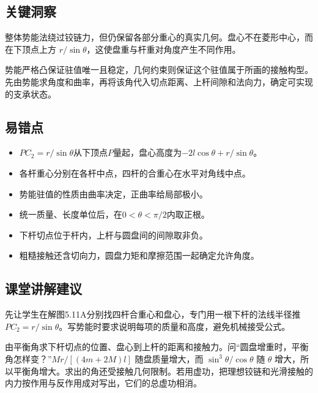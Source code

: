 \documentclass[UTF8,fontset=fandol,a4paper,11pt]{ctexart}
\begin{document}
\subsection*{关键洞察}

整体势能法绕过铰链力，但仍保留各部分重心的真实几何。盘心不在菱形中心，而在下顶点上方 $r/\sin\theta$，这使盘重与杆重对角度产生不同作用。

势能严格凸保证驻值唯一且稳定，几何约束则保证这个驻值属于所画的接触构型。先由势能求角度和曲率，再将该角代入切点距离、上杆间隙和法向力，确定可实现的支承状态。



\subsection*{易错点}

\begin{itemize}
\item $PC_2=r/\sin\theta$从下顶点$P$量起，盘心高度为$-2l\cos\theta+r/\sin\theta$。
\item 各杆重心分别在各杆中点，四杆的合重心在水平对角线中点。
\item 势能驻值的性质由曲率决定，正曲率给局部极小。
\item 统一质量、长度单位后，在$0<\theta<\pi/2$内取正根。
\item 下杆切点位于杆内，上杆与圆盘间的间隙取非负。
\item 粗糙接触还含切向力，圆盘力矩和摩擦范围一起确定允许角度。
\end{itemize}



\subsection*{课堂讲解建议}

先让学生在解图5.11A分别找四杆合重心和盘心，专门用一根下杆的法线半径推 $PC_2=r/\sin\theta$。写势能时要求说明每项的质量和高度，避免机械接受公式。

由平衡角求下杆切点的位置、盘心到上杆的距离和接触力。问“圆盘增重时，平衡角怎样变？”$Mr/[(4m+2M)l]$ 随盘质量增大，而 $\sin^3\theta/\cos\theta$ 随 $\theta$ 增大，所以平衡角增大。求出的角还受接触几何限制。若用虚功，把理想铰链和光滑接触的内力按作用与反作用成对写出，它们的总虚功相消。
\end{document}
